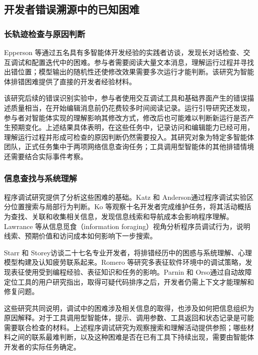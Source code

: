 \subsection{开发者错误溯源中的已知困难}

\subsubsection{长轨迹检查与原因判断}

Epperson 等\cite{ref02}通过五名具有多智能体开发经验的实践者访谈，发现长对话检查、交互调试和配置迭代中的困难。参与者需要阅读大量文本消息，理解运行过程并寻找出错位置；模型输出的随机性还使修改效果需要多次运行才能判断。该研究为智能体排错困难提供了直接的开发者经验材料。

该研究后续的错误识别实验中，参与者使用交互调试工具和基础界面产生的错误描述质量相当，在开始编辑消息前仍花费较多时间阅读记录。运行引导研究还发现，参与者对智能体实现的理解影响其修改方式，修改后也可能难以判断新运行是否产生预期变化。上述结果具体表明，在这些任务中，记录访问和编辑能力已经可用，理解运行过程并形成可检查的原因判断仍然需要投入。其研究对象为特定多智能体团队，正式任务集中于两项网络信息查询任务；工具调用型智能体的其他排错情境还需要结合实际事件考察。

\subsubsection{信息查找与系统理解}

程序调试研究提供了分析这些困难的基础。Katz 和 Anderson\cite{ref15}通过程序调试实验区分位置搜索与局部行为判断。Ko 等\cite{ref14}观察十名开发者完成维护任务，将其活动概括为查找、关联和收集相关信息，发现信息线索和导航成本会影响程序理解。Lawrance 等\cite{ref08}从信息觅食（information foraging）视角分析程序员调试行为，说明线索、预期价值和访问成本如何影响下一步搜索。

Starr 和 Storey\cite{ref16}访谈二十七名专业开发者，将排错经历中的困惑与系统理解、心理模型构建及认知疲劳联系起来。Romero 等\cite{ref34}研究多表征软件环境中的调试策略，发现表征使用受到编程经验、表征知识和任务的影响。Parnin 和 Orso\cite{ref35}通过自动故障定位工具的用户研究指出，取得可疑代码排序之后，开发者仍需上下文才能理解和修复问题。

这些研究共同说明，调试中的困难涉及相关信息的取得，也涉及如何把信息组织为原因解释。对于工具调用型智能体，提示、调用参数、工具返回和状态记录是可能需要联合检查的材料。上述程序调试研究为观察搜索和理解活动提供参照；哪些材料之间的联系最难判断，以及这种困难是否在已有工具下持续出现，需要由智能体开发者的实际任务确定。

